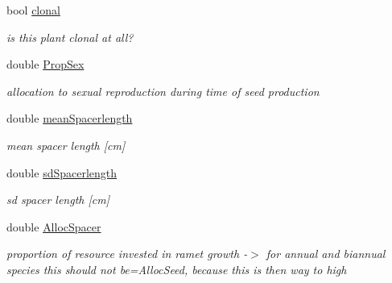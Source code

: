 \begin{DoxyCompactItemize}
\mbox{\label{class_s_pft_traits_a37b91c6f410774b1e8953364eb1aa01f}} 
bool \mbox{\hyperlink{class_s_pft_traits_a37b91c6f410774b1e8953364eb1aa01f}{clonal}}
\begin{DoxyCompactList}\small\item\em is this plant clonal at all? \end{DoxyCompactList}\item 
\mbox{\label{class_s_pft_traits_a8ba6bda1e985856e57dd8cde29f755f2}} 
double \mbox{\hyperlink{class_s_pft_traits_a8ba6bda1e985856e57dd8cde29f755f2}{Prop\+Sex}}
\begin{DoxyCompactList}\small\item\em allocation to sexual reproduction during time of seed production \end{DoxyCompactList}\item 
\mbox{\label{class_s_pft_traits_a272403e9be0b736d37f30a3891ffbff0}} 
double \mbox{\hyperlink{class_s_pft_traits_a272403e9be0b736d37f30a3891ffbff0}{mean\+Spacerlength}}
\begin{DoxyCompactList}\small\item\em mean spacer length \mbox{[}cm\mbox{]} \end{DoxyCompactList}\item 
\mbox{\label{class_s_pft_traits_a85289ca459526d898c777db2e88c65f2}} 
double \mbox{\hyperlink{class_s_pft_traits_a85289ca459526d898c777db2e88c65f2}{sd\+Spacerlength}}
\begin{DoxyCompactList}\small\item\em sd spacer length \mbox{[}cm\mbox{]} \end{DoxyCompactList}\item 
\mbox{\label{class_s_pft_traits_a51ab5cddc07b00e4503211f7f9aa6766}} 
double \mbox{\hyperlink{class_s_pft_traits_a51ab5cddc07b00e4503211f7f9aa6766}{Alloc\+Spacer}}
\begin{DoxyCompactList}\small\item\em proportion of resource invested in ramet growth -\/$>$ for annual and biannual species this should not be=Alloc\+Seed, because this is then way to high \end{DoxyCompactList}\item 
\mbox{\label{class_s_pft_traits_aa45d6adb471357506db921078429845e}} 

\end{DoxyCompactItemize}
